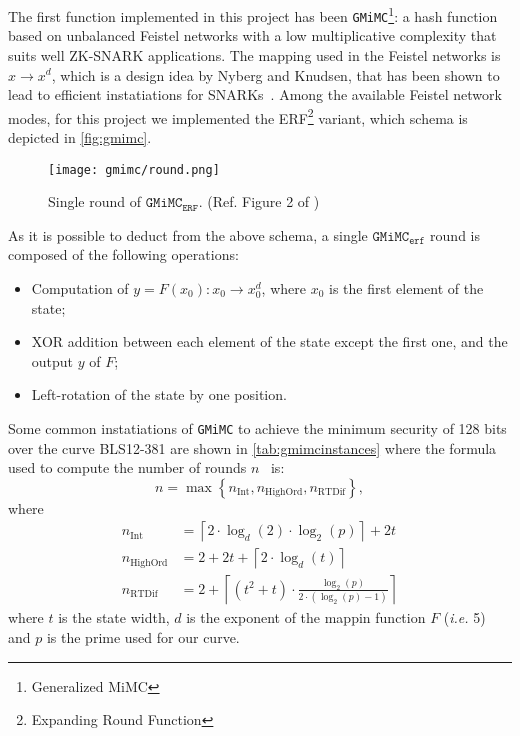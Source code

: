 \documentclass[12pt, a4paper]{report}
\begin{document}
The first function implemented in this project has been \texttt{GMiMC}\footnote{Generalized MiMC}: a hash function based on unbalanced Feistel networks with a low multiplicative complexity that suits well ZK-SNARK applications. The mapping used in the Feistel networks is $x \rightarrow x^d$, which is a design idea by Nyberg and Knudsen, that has been shown to lead to efficient instatiations for SNARKs~\cite{mimc}. Among the available Feistel network modes, for this project we implemented the ERF\footnote{Expanding Round Function} variant, which schema is depicted in \autoref{fig:gmimc}.

\begin{figure}[H]
  \begin{center}
    \texttt{[image: gmimc/round.png]}
  \end{center}
  \caption{Single round of $\texttt{GMiMC}_\texttt{ERF}$. (Ref. Figure 2 of \cite{gmimc})}\label{fig:gmimc}
\end{figure}

As it is possible to deduct from the above schema, a single $\texttt{GMiMC}_\texttt{erf}$ round is composed of the following operations:
\begin{itemize}
  \item Computation of $y = F(x_0): x_0 \rightarrow x_0^d$, where $x_0$ is the first element of the state;
  \item XOR addition between each element of the state except the first one, and the output $y$ of $F$;
  \item Left-rotation of the state by one position.
\end{itemize}

Some common instatiations of \texttt{GMiMC} to achieve the minimum security of 128 bits over the curve BLS12-381 are shown in \autoref{tab:gmimcinstances} where the formula used to compute the number of rounds $n$~\cite[Tab.~3]{gmimc} is:
\begin{equation}
  n = \max \left\{ n_{\text{Int}}, n_{\text{HighOrd}}, n_{\text{RTDif}} \right\},
  \label{eq:gmimcrounds}
\end{equation}
where~\cite[Tab.~2]{gmimc}
\begin{align}
  n_{\text{Int}} & = \left \lceil 2 \cdot \log_d(2) \cdot \log_2(p) \right\rceil + 2t \\[10pt]
  n_{\text{HighOrd}} & = 2 + 2t + \left \lceil 2 \cdot \log_d(t) \right\rceil \\[6pt]
  n_{\text{RTDif}} & = 2 + \left \lceil (t^2 + t) \cdot \frac{\log_2(p)}{2 \cdot (\log_2(p) - 1)} \right\rceil
\end{align}
where $t$ is the state width, $d$ is the exponent of the mappin function $F$ (\textsl{i.e.} 5) and $p$ is the prime used for our curve.
\end{document}

